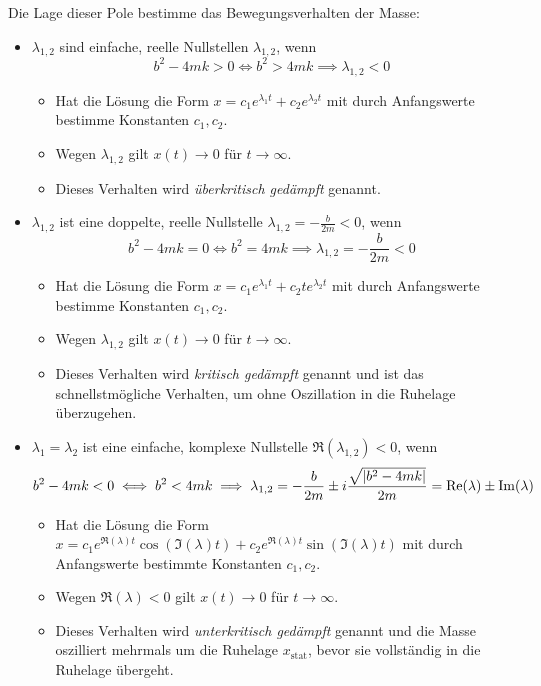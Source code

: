 				Die Lage dieser Pole bestimme das Bewegungsverhalten der Masse:
				\begin{itemize}
					\item \( \lambda _ { 1, 2 } \) sind einfache, reelle Nullstellen \( \lambda _ { 1, 2 } \), wenn
						\begin{equation*}
							b ^ 2 - 4mk > 0 \iff b ^ 2 > 4mk \implies \lambda _ { 1, 2 } < 0
						\end{equation*}
						\begin{itemize}
							\item Hat die Lösung die Form \( x = c_1 e^{\lambda_1 t} + c_2 e^{\lambda_2 t} \) mit durch Anfangswerte bestimme Konstanten \( c _ 1, c _ 2 \).
							\item Wegen \( \lambda _ { 1, 2 } \) gilt \( x(t) \rightarrow 0 \) für \( t \rightarrow \infty \).
							\item Dieses Verhalten wird \textit{überkritisch gedämpft} genannt.
						\end{itemize}
					\item \( \lambda _ { 1, 2 } \) ist eine doppelte, reelle Nullstelle \( \lambda_{1,2} = -\frac{b}{2m} < 0 \), wenn
						\begin{equation*}
							b^2 - 4mk = 0 \iff b^2 = 4mk \implies \lambda _ { 1, 2 } = -\frac{b}{2m} < 0
						\end{equation*}
						\begin{itemize}
							\item Hat die Lösung die Form \( x = c_1 e^{\lambda_1 t} + c_2 t e^{\lambda_2 t} \) mit durch Anfangswerte bestimme Konstanten \( c _ 1, c _ 2 \).
							\item Wegen \( \lambda _ { 1, 2 } \) gilt \( x(t) \rightarrow 0 \) für \( t \rightarrow \infty \).
							\item Dieses Verhalten wird \textit{kritisch gedämpft} genannt und ist das schnellstmögliche Verhalten, um ohne Oszillation in die Ruhelage überzugehen.
						\end{itemize}
					\item \( \lambda _ 1 = \lambda _ 2 \) ist eine einfache, komplexe Nullstelle \( \Re(\lambda _ {1,2}) < 0 \), wenn
						\begin{equation*}
							b ^ 2 - 4mk < 0 \iff b ^ 2 < 4mk \implies \lambda _ { 1, 2 } = -\frac{b}{2m} \pm i \frac{\sqrt{\abs{b^2 - 4mk}}}{2m} = \Re(\lambda) \pm \Im(\lambda)
						\end{equation*}
						\begin{itemize}
							\item Hat die Lösung die Form \( x = c_1 e ^ { \Re(\lambda) t } \cos(\Im(\lambda) t) + c_2 e ^ { \Re(\lambda) t } \sin(\Im(\lambda) t) \) mit durch Anfangswerte bestimmte Konstanten \( c _ 1, c _ 2 \).
							\item Wegen \( \Re(\lambda) < 0 \) gilt \( x(t) \rightarrow 0 \) für \( t \rightarrow \infty \).
							\item Dieses Verhalten wird \textit{unterkritisch gedämpft} genannt und die Masse oszilliert mehrmals um die Ruhelage \( x _ \text{stat} \), bevor sie vollständig in die Ruhelage übergeht.
						\end{itemize}
				\end{itemize}

